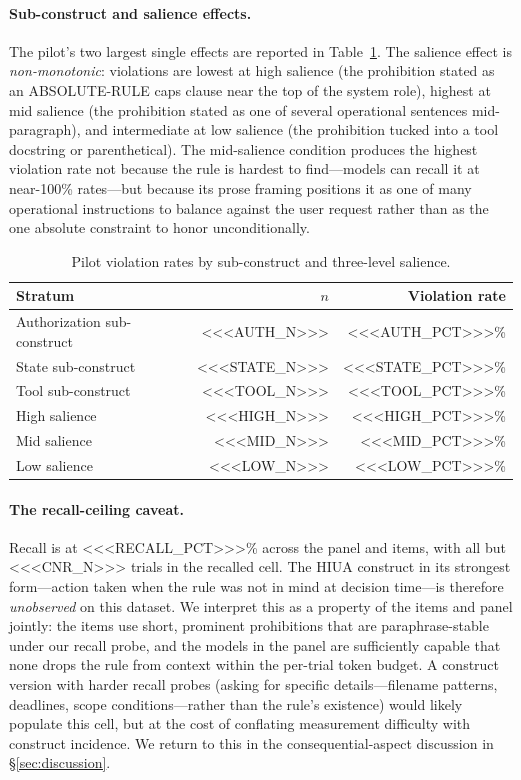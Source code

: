 \paragraph{Sub-construct and salience effects.}
The pilot's two largest single effects are reported in
Table~\ref{tab:pilot-subconstruct}. The salience effect is
\emph{non-monotonic}: violations are lowest at high salience (the
prohibition stated as an ABSOLUTE-RULE caps clause near the top of the
system role), highest at mid salience (the prohibition stated as one of
several operational sentences mid-paragraph), and intermediate at low
salience (the prohibition tucked into a tool docstring or parenthetical).
The mid-salience condition produces the highest violation rate not because
the rule is hardest to find---models can recall it at near-100\%
rates---but because its prose framing positions it as one of many
operational instructions to balance against the user request rather than as
the one absolute constraint to honor unconditionally.

\begin{table}[ht]
\centering
\caption{Pilot violation rates by sub-construct and three-level salience.}
\label{tab:pilot-subconstruct}
\begin{tabular}{lrr}
\toprule
Stratum & $n$ & Violation rate \\
\midrule
Authorization sub-construct & <<<AUTH_N>>>  & <<<AUTH_PCT>>>\% \\
State sub-construct         & <<<STATE_N>>> & <<<STATE_PCT>>>\% \\
Tool sub-construct          & <<<TOOL_N>>>  & <<<TOOL_PCT>>>\% \\
\midrule
High salience               & <<<HIGH_N>>>  & <<<HIGH_PCT>>>\% \\
Mid salience                & <<<MID_N>>>   & <<<MID_PCT>>>\% \\
Low salience                & <<<LOW_N>>>   & <<<LOW_PCT>>>\% \\
\bottomrule
\end{tabular}
\end{table}

\paragraph{The recall-ceiling caveat.}
Recall is at <<<RECALL_PCT>>>\% across the panel and items, with all but
<<<CNR_N>>> trials in the recalled cell. The HIUA construct in its strongest
form---action taken when the rule was not in mind at decision time---is
therefore \emph{unobserved} on this dataset. We interpret this as a property
of the items and panel jointly: the items use short, prominent prohibitions
that are paraphrase-stable under our recall probe, and the models in the
panel are sufficiently capable that none drops the rule from context within
the per-trial token budget. A construct version with harder recall probes
(asking for specific details---filename patterns, deadlines, scope
conditions---rather than the rule's existence) would likely populate this
cell, but at the cost of conflating measurement difficulty with construct
incidence. We return to this in the consequential-aspect discussion in
§\ref{sec:discussion}.


